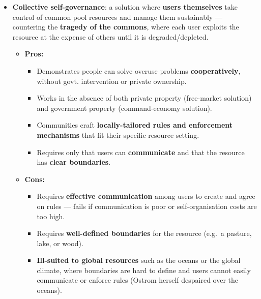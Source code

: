\begin{itemize}
\begin{itemize}
\begin{itemize}
      \item \textbf{Cannot distinguish between firms} with low vs.\ high pollution-reduction costs $\to$ pollution is reduced at a \textit{higher overall cost} than market-based policies.
      \item \textbf{Same technical limitations} as market-based policies (lack of information on pollutant types and quantities) $\to$ only \textit{partially effective}.
      \item \textbf{Costly monitoring and supervision} to detect violations; OPC and enforcement problems.
      \item Effectiveness varies with the situation --- more effective in some contexts than others.
    \end{itemize}
  \end{itemize}
  \item \textbf{Collective self-governance}: a solution where \textbf{users themselves} take control of common pool resources and manage them sustainably --- countering the \textbf{tragedy of the commons}, where each user exploits the resource at the expense of others until it is degraded/depleted.
  \begin{itemize}
    \item \textbf{Pros:}
    \begin{itemize}
      \item Demonstrates people can solve overuse problems \textbf{cooperatively}, without govt. intervention or private ownership.
      \item Works in the absence of both private property (free-market solution) and government property (command-economy solution).
      \item Communities craft \textbf{locally-tailored rules and enforcement mechanisms} that fit their specific resource setting.
      \item Requires only that users can \textbf{communicate} and that the resource has \textbf{clear boundaries}.
    \end{itemize}
    \item \textbf{Cons:}
    \begin{itemize}
      \item Requires \textbf{effective communication} among users to create and agree on rules --- fails if communication is poor or self-organisation costs are too high.
      \item Requires \textbf{well-defined boundaries} for the resource (e.g.\ a pasture, lake, or wood).
      \item \textbf{Ill-suited to global resources} such as the oceans or the global climate, where boundaries are hard to define and users cannot easily communicate or enforce rules (Ostrom herself despaired over the oceans).

\end{itemize}
\end{itemize}
\end{itemize}
